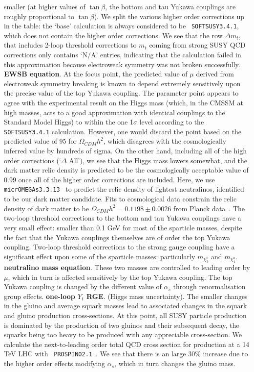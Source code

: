 \documentclass[final,3p,times,pdflatex]{elsarticle}
\begin{document}
smaller (at higher values of $\tan \beta$, the bottom and tau Yukawa couplings
are roughly proportional to $\tan \beta$).
We split the various higher order corrections up in
the table: the `base' calculation is always considered to be {\tt
  SOFTSUSY3.4.1}, which does not contain the higher order corrections. 
We see that the row $\Delta m_t$, that includes 2-loop threshold corrections
to $m_t$ coming from strong SUSY QCD corrections only contains `N/A' entries,
indicating that the calculation failed in this approximation because
electroweak symmetry was not broken successfully. {\bf EWSB equation}.
At the focus point,
the predicted value of $\mu$ derived from electroweak symmetry breaking is
known to 
depend extremely sensitively upon the precise value of the top Yukawa
coupling. 
The parameter point appears to agree with the experimental result on the Higgs
mass (which, in the CMSSM at high masses, acts to a good approximation with
identical couplings to the Standard Model Higgs)
to within the one 1$\sigma$ level according to the {\tt SOFTSUSY3.4.1}
calculation. However, one would discard the point based on the predicted value
of 95 for $\Omega_{CDM} h^2$, which disagrees with the cosmologically inferred
value by hundreds of sigma. On the other hand, including all of the high order
corrections (`$\Delta$ All'), we see that the Higgs mass lowers somewhat, and
the dark matter 
relic density is predicted to be the cosmologically acceptable value of 0.99
once all of the higher order corrections are included.
Here, we use {\tt
  micrOMEGAs3.3.13}~\cite{Belanger:2001fz,Belanger:2004yn,Belanger:2013oya} to 
predict the relic density of 
lightest neutralinos, identified to be our dark matter candidate. 
Fits to cosmological data constrain the relic density of dark matter to be
$\Omega_{CDM} h^2=0.1198 \pm 0.0026$ from Planck data~\cite{Ade:2013zuv}.
The two-loop threshold corrections to the bottom and tau Yukawa couplings 
have a very small effect: smaller than 0.1 GeV for most of the sparticle
masses, despite the fact that the Yukawa couplings themselves are of order the
top Yukawa coupling. 
Two-loop threshold corrections to the strong gauge coupling have a significant
effect upon some of the sparticle masses: particularly $m_{\chi_3^0}$ and
$m_{\chi_4^0}$. {\bf neutralino mass equation}.
These two masses are controlled to leading order by $\mu$,
which in turn is affected sensitively by the top Yukawa coupling. 
The top Yukawa coupling is changed by the different value of $\alpha_s$
through renormalisation group effects. {\bf one-loop $Y_t$ RGE}.
(Higgs mass uncertainty).
The smaller changes in the gluino and average squark masses lead to associated
changes in the squark and gluino production cross-sections. At this point, all
SUSY particle production is dominated by the production of two gluinos and
their subsequent decay, the squarks being too heavy to be produced with any
appreciable cross-section. We calculate the next-to-leading order total QCD
cross section for production at a 14 TeV LHC with {\tt
  PROSPINO2.1}~\cite{Beenakker:1996ed,Beenakker:1996ch}. We see that there is
an large 30$\%$ increase due to the higher order effects modifying $\alpha_s$,
which in turn changes the gluino mass. 
\end{document}
